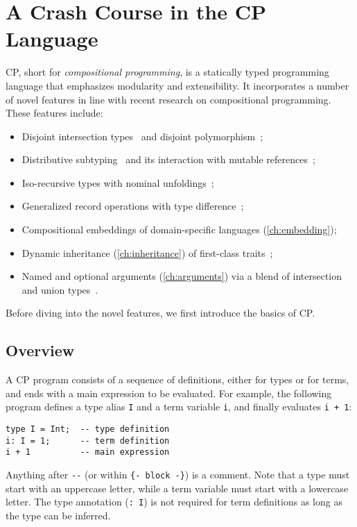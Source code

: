 \chapter{A Crash Course in the CP Language} \label{ch:cp}

CP, short for \emph{compositional programming}, is a statically typed
programming language that emphasizes modularity and extensibility. It
incorporates a number of novel features in line with recent research on
compositional programming. These features include:
\begin{itemize}
\item Disjoint intersection types~\citep{oliveira2016disjoint} and disjoint
      polymorphism~\citep{alpuim2017disjoint,xie2020row};
\item Distributive subtyping~\citep{bi2018essence,bi2019distributive} and its
      interaction with mutable references~\citep{ye2024imperative};
\item Iso-recursive types with nominal unfoldings~\citep{zhou2022calculus};
\item Generalized record operations with type difference~\citep{xu2023making};
\item Compositional embeddings of domain-specific languages
      (\autoref{ch:embedding});
\item Dynamic inheritance (\autoref{ch:inheritance}) of first-class
      traits~\citep{bi2018typed};
\item Named and optional arguments (\autoref{ch:arguments}) via a blend of
      intersection and union types~\citep{rehman2023blend}.
\end{itemize}
Before diving into the novel features, we first introduce the basics of CP.

\section{Overview}

A CP program consists of a sequence of definitions, either for types or for
terms, and ends with a main expression to be evaluated. For example, the
following program defines a type alias \lstinline{I} and a term variable
\lstinline{i}, and finally evaluates \lstinline{i + 1}:
\begin{lstlisting}[xleftmargin=.3\textwidth]
type I = Int;  -- type definition
i: I = 1;      -- term definition
i + 1          -- main expression
\end{lstlisting}
Anything after \lstinline{--} (or within \lstinline|{- block -}|) is a comment.
Note that a type must start with an uppercase letter, while a term variable must
start with a lowercase letter. The type annotation (\lstinline{: I}) is not
required for term definitions as long as the type can be inferred.

